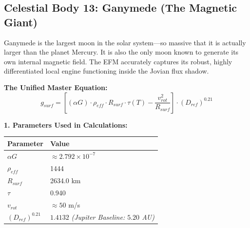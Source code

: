 \documentclass[11pt, a4paper]{article}
\begin{document}
\clearpage
\subsection{Celestial Body 13: Ganymede (The Magnetic Giant)}
  Ganymede is the largest moon in the solar system—so massive that it is actually larger than the planet Mercury. It is also the only moon known to generate its own internal magnetic field. The EFM accurately captures its robust, highly differentiated local engine functioning inside the Jovian flux shadow.

  \vspace{0.5em}
  \noindent \textbf{The Unified Master Equation:}
  $$ g_{surf} = \left[ (\alpha G) \cdot \rho_{eff} \cdot R_{surf} \cdot \tau(T) - \frac{v_{rot}^2}{R_{surf}} \right] \cdot (D_{ref})^{0.21} $$

  \vspace{0.5em}
  \noindent \textbf{1. Parameters Used in Calculations:} \\[0.5em]
  \begingroup
  \renewcommand{\arraystretch}{1.3}
  \hspace*{2em}
  \begin{tabular}{|l|l|}
    \hline
    \textbf{Parameter} & \textbf{Value} \\ \hline
    $\alpha G$ & $\approx 2.792 \times 10^{-7}$ \\ \hline
    $\rho_{eff}$ & 1444 \\ \hline
    $R_{surf}$ & 2634.0 km \\ \hline
    $\tau$ & 0.940 \\ \hline
    $v_{rot}$ & $\approx 50$ m/s \\ \hline
    $(D_{ref})^{0.21}$ & $1.4132$ \textit{(Jupiter Baseline: $5.20$ AU)} \\ \hline
  \end{tabular}
  \endgroup
\end{document}

